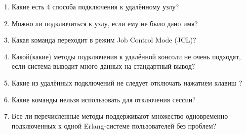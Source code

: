\begin{enumerate}
	\item Какие есть 4 способа подключения к удалённому узлу?
	\item Можно ли подключиться к узлу, если ему не было дано имя?
	\item Какая команда переходит в режим Job Control Mode (JCL)?
	\item Какой(какие) методы подключения к удалённой консоли не очень подходят, если система выводит много данных на стандартный вывод?
	\item Какие из удалённых подключений не следует отключать нажатием клавиш ?
	\item Какие команды нельзя использовать для отключения сессии?
	\item Все ли перечисленные методы поддерживают множество одновременно подключенных к одной Erlang-системе пользователей без проблем?
\end{enumerate}

